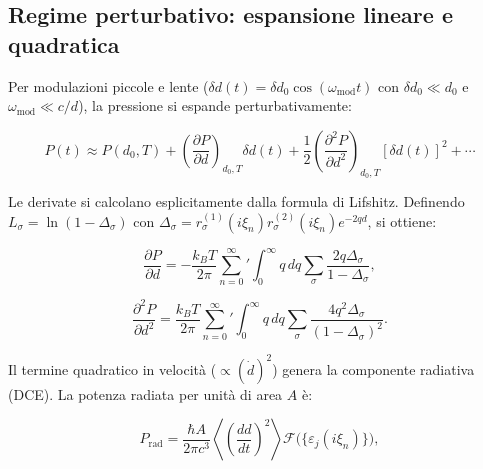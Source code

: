 \documentclass[11pt,a4paper]{article}
\theoremstyle{plain}
\theoremstyle{definition}
\begin{document}
\subsection{Regime perturbativo: espansione lineare e quadratica}

\vspace{0.3cm}

Per modulazioni piccole e lente ($\delta d(t) = \delta d_0 \cos(\omega_{\mathrm{mod}} t)$ con $\delta d_0 \ll d_0$ e $\omega_{\mathrm{mod}} \ll c/d$), la pressione si espande perturbativamente:

\begin{equation}
P(t) \approx P(d_0,T) + \left( \frac{\partial P}{\partial d} \right)_{d_0,T} \delta d(t) + \frac{1}{2} \left( \frac{\partial^2 P}{\partial d^2} \right)_{d_0,T} [\delta d(t)]^2 + \cdots
\label{eq:lifshitz-perturb}
\end{equation}

\vspace{0.3cm}

Le derivate si calcolano esplicitamente dalla formula di Lifshitz. Definendo $L_\sigma = \ln(1 - \Delta_\sigma)$ con $\Delta_\sigma = r_\sigma^{(1)}(i\xi_n) r_\sigma^{(2)}(i\xi_n) e^{-2 q d}$, si ottiene:

\begin{equation}
\frac{\partial P}{\partial d} = -\frac{k_B T}{2\pi} \sum_{n=0}^\infty{}' \int_0^\infty q \, dq \sum_{\sigma} \frac{2q \Delta_\sigma}{1 - \Delta_\sigma},
\label{eq:first-deriv-lifshitz}
\end{equation}

\begin{equation}
\frac{\partial^2 P}{\partial d^2} = \frac{k_B T}{2\pi} \sum_{n=0}^\infty{}' \int_0^\infty q \, dq \sum_{\sigma} \frac{4q^2 \Delta_\sigma}{(1 - \Delta_\sigma)^2}.
\label{eq:second-deriv-lifshitz}
\end{equation}

\vspace{0.4cm}

Il termine quadratico in velocità ($\propto (\dot{d})^2$) genera la componente radiativa (DCE). La potenza radiata per unità di area $A$ è:

\begin{equation}
P_{\mathrm{rad}} = \frac{\hbar A}{2\pi c^3} \left\langle \left( \frac{dd}{dt} \right)^2 \right\rangle \mathcal{F}\bigl(\{\varepsilon_j(i\xi_n)\}\bigr),
\label{eq:dce-power-deriv}
\end{equation}
\end{document}
